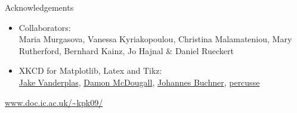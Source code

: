 \documentclass[12pt]{beamer}
\begin{document}
\begin{frame}{Acknowledgements}

\begin{itemize}

\item Collaborators:\\
Maria Murgasova,
Vanessa Kyriakopoulou, Christina
Malamateniou, Mary Rutherford, Bernhard
Kainz, Jo Hajnal \& Daniel Rueckert

\vspace{0.06\textheight}

\item XKCD for Matplotlib, Latex and Tikz:\\
\href{http://jakevdp.github.io/blog/2012/10/07/xkcd-style-plots-in-matplotlib/}{Jake
  Vanderplas},
\href{http://www.mail-archive.com/matplotlib-users@lists.sourceforge.net/msg25499.html}{Damon McDougall},
\href{https://github.com/JohannesBuchner/matplotlib-xkcdify}{Johannes Buchner},
\href{http://tex.stackexchange.com/questions/39296/simulating-hand-drawn-lines}{percusse}

\end{itemize}

\vspace{0.01\textheight}

\begin{center}
\large
\color{xkcd_color}
\href{http://www.doc.ic.ac.uk/~kpk09/}{www.doc.ic.ac.uk/\textasciitilde kpk09/}
\end{center}
\end{frame}
\end{document}
